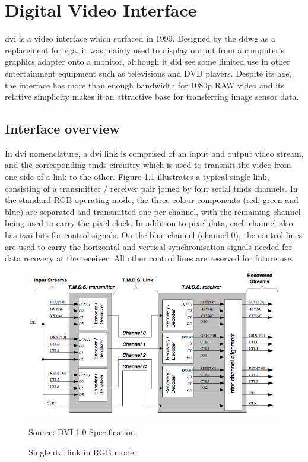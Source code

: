 \chapter{Digital Video Interface}
\gls{dvi} is a video interface which surfaced in 1999. Designed by the \gls{ddwg} as a replacement for \gls{vga}, it was mainly used to display output from a computer's graphics adapter onto a monitor, although it did see some limited use in other entertainment equipment such as televisions and DVD players. Despite its age, the interface has more than enough bandwidth for 1080p RAW video and its relative simplicity makes it an attractive base for transferring image sensor data.

\section{Interface overview}

In \gls{dvi} nomenclature, a \gls{dvi} link is comprised of an input and output video stream, and the corresponding \gls{tmds} circuitry which is used to transmit the video from one side of a link to the other. Figure \ref{fig:dvi_link_overview} illustrates a typical single-link, consisting of a transmitter / receiver pair joined by four serial \gls{tmds} channels. In the standard RGB operating mode, the three colour components (red, green and blue) are separated and transmitted one per channel, with the remaining channel being used to carry the pixel clock. In addition to pixel data, each channel also has two bits for control signals. On the blue channel (channel 0), the control lines are used to carry the horizontal and vertical synchronisation signals needed for data recovery at the receiver. All other control lines are reserved for future use.

\begin{figure}
  \centering
  \includegraphics[width=1\textwidth]{./img/dvi_link_overview.png}\par
Source: DVI 1.0 Specification
  \caption{Single \gls{dvi} link in RGB mode.}
  \label{fig:dvi_link_overview}
\end{figure}

